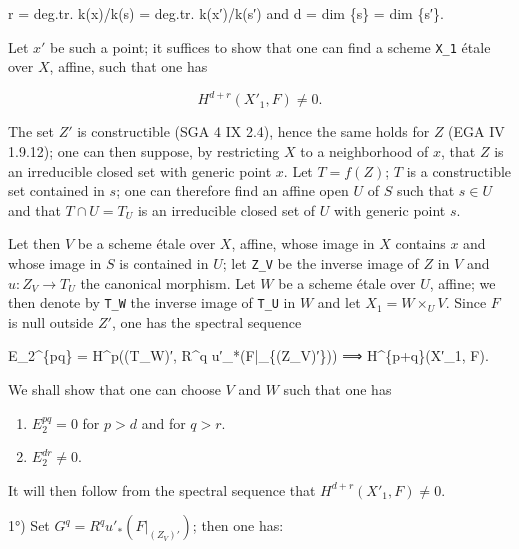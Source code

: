 \documentclass[
]{article}
\newenvironment{Shaded}{}{}
\newcommand{\NormalTok}[1]{#1}
\begin{document}
\begin{Shaded}
\begin{Highlighting}[]
\NormalTok{r = deg.tr. k(x)/k(s) = deg.tr. k(x′)/k(s′) and d = dim \{s\} = dim \{s′\}.}
\end{Highlighting}
\end{Shaded}

Let \(x'\) be such a point; it suffices to show that one can find a
scheme \texttt{X\_1} étale over \(X\), affine, such that one has

\[
H^{d+r}(X'_{1}, F) \neq 0.
\]

The set \(Z'\) is constructible (SGA 4 IX 2.4), hence the same holds for
\(Z\) (EGA IV 1.9.12); one can then suppose, by restricting \(X\) to a
neighborhood of \(x\), that \(Z\) is an irreducible closed set with
generic point \(x\). Let \(T = f(Z)\); \(T\) is a constructible set
contained in \({s}\); one can therefore find an affine open \(U\) of
\(S\) such that \(s \in U\) and that \(T \cap U = T_{U}\) is an
irreducible closed set of \(U\) with generic point \(s\).

Let then \(V\) be a scheme étale over \(X\), affine, whose image in
\(X\) contains \(x\) and whose image in \(S\) is contained in \(U\); let
\texttt{Z\_V} be the inverse image of \(Z\) in \(V\) and
\(u : Z_{V} \to T_{U}\) the canonical morphism. Let \(W\) be a scheme
étale over \(U\), affine; we then denote by \texttt{T\_W} the inverse
image of \texttt{T\_U} in \(W\) and let \(X_{1} = W \times_{U} V\).
Since \(F\) is null outside \(Z'\), one has the spectral sequence

\begin{Shaded}
\begin{Highlighting}[]
\NormalTok{E\_2\^{}\{pq\} = H\^{}p((T\_W)′, R\^{}q u′\_*(F|\_\{(Z\_V)′\})) ⟹ H\^{}\{p+q\}(X′\_1, F).}
\end{Highlighting}
\end{Shaded}

We shall show that one can choose \(V\) and \(W\) such that one has

\begin{enumerate}
\def\labelenumi{\alph{enumi})}
\item
  \(E^{pq}_{2} = 0\) for \(p > d\) and for \(q > r\).
\item
  \(E^{dr}_{2} \neq 0\).
\end{enumerate}

It will then follow from the spectral sequence that
\(H^{d+r}(X'_{1}, F) \neq 0\).

1°) Set \(G^{q} = R^{q} u'_{*}(F|_{(Z_{V})'})\); then one has:
\end{document}
